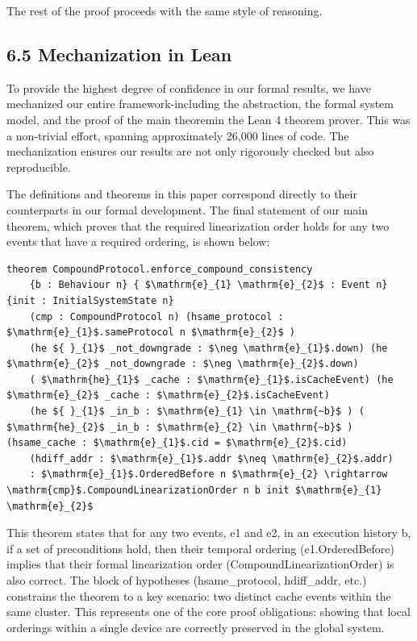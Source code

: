 \documentclass[10pt]{article}
\begin{document}
The rest of the proof proceeds with the same style of reasoning.

\subsection*{6.5 Mechanization in Lean}
To provide the highest degree of confidence in our formal results, we have mechanized our entire framework-including the abstraction, the formal system model, and the proof of the main theoremin the Lean 4 theorem prover. This was a non-trivial effort, spanning approximately 26,000 lines of code. The mechanization ensures our results are not only rigorously checked but also reproducible.

The definitions and theorems in this paper correspond directly to their counterparts in our formal development. The final statement of our main theorem, which proves that the required linearization order holds for any two events that have a required ordering, is shown below:

\begin{lstlisting}[mathescape=true]
theorem CompoundProtocol.enforce_compound_consistency
    {b : Behaviour n} { $\mathrm{e}_{1} \mathrm{e}_{2}$ : Event n} {init : InitialSystemState n}
    (cmp : CompoundProtocol n) (hsame_protocol : $\mathrm{e}_{1}$.sameProtocol n $\mathrm{e}_{2}$ )
    (he ${ }_{1}$ _not_downgrade : $\neg \mathrm{e}_{1}$.down) (he $\mathrm{e}_{2}$ _not_downgrade : $\neg \mathrm{e}_{2}$.down)
    ( $\mathrm{he}_{1}$ _cache : $\mathrm{e}_{1}$.isCacheEvent) (he $\mathrm{e}_{2}$ _cache : $\mathrm{e}_{2}$.isCacheEvent)
    (he ${ }_{1}$ _in_b : $\mathrm{e}_{1} \in \mathrm{~b}$ ) ( $\mathrm{he}_{2}$ _in_b : $\mathrm{e}_{2} \in \mathrm{~b}$ ) (hsame_cache : $\mathrm{e}_{1}$.cid = $\mathrm{e}_{2}$.cid)
    (hdiff_addr : $\mathrm{e}_{1}$.addr $\neq \mathrm{e}_{2}$.addr)
    : $\mathrm{e}_{1}$.OrderedBefore n $\mathrm{e}_{2} \rightarrow \mathrm{cmp}$.CompoundLinearizationOrder n b init $\mathrm{e}_{1} \mathrm{e}_{2}$
\end{lstlisting}
This theorem states that for any two events, e1 and e2, in an execution history b, if a set of preconditions hold, then their temporal ordering (e1.OrderedBefore) implies that their formal linearization order (CompoundLinearizationOrder) is also correct. The block of hypotheses (hsame\_protocol, hdiff\_addr, etc.) constrains the theorem to a key scenario: two distinct cache events within the same cluster. This represents one of the core proof obligations: showing that local orderings within a single device are correctly preserved in the global system.
\end{document}
